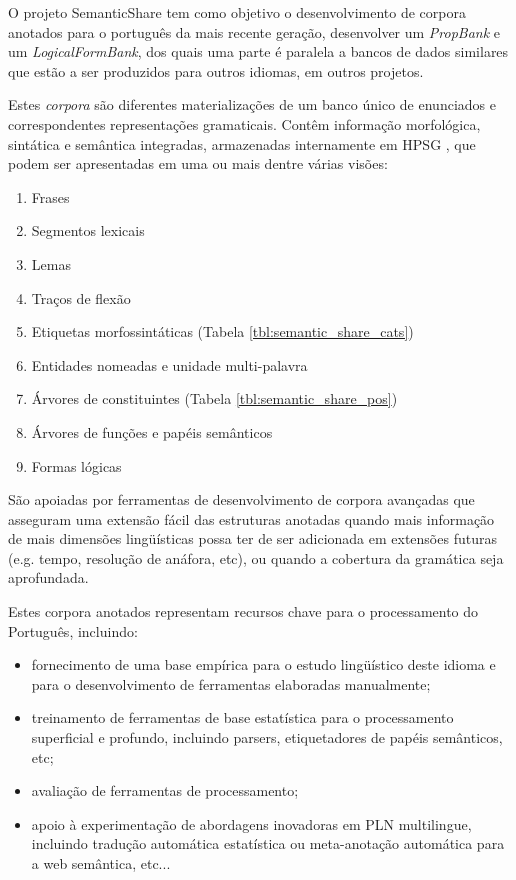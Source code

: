 O projeto SemanticShare \cite{semanticshare} tem como objetivo o desenvolvimento de corpora anotados para o português da mais recente geração, desenvolver um \emph{PropBank} e um \emph{LogicalFormBank}, dos quais uma parte é paralela a bancos de dados similares que estão a ser produzidos para outros idiomas, em outros projetos.

Estes \emph{corpora} são diferentes materializações de um banco único de enunciados e correspondentes representações gramaticais. Contêm informação morfológica, sintática e semântica integradas, armazenadas internamente em HPSG \cite{branco08}, que podem ser apresentadas em uma ou mais dentre várias visões:

\begin{enumerate}
  \item Frases
  \item Segmentos lexicais
  \item Lemas
  \item Traços de flexão
  \item Etiquetas morfossintáticas (Tabela \ref{tbl:semantic_share_cats})
  \item Entidades nomeadas e unidade multi-palavra
  \item Árvores de constituintes (Tabela \ref{tbl:semantic_share_pos})
  \item Árvores de funções e papéis semânticos
  \item Formas lógicas
\end{enumerate}

São apoiadas por ferramentas de desenvolvimento de corpora avançadas que asseguram uma extensão fácil das estruturas anotadas quando mais informação de mais dimensões lingüísticas possa ter de ser adicionada em extensões futuras (e.g. tempo, resolução de anáfora, etc), ou quando a cobertura da gramática seja aprofundada.

Estes corpora anotados representam recursos chave para o processamento do Português, incluindo:

\begin{itemize}
  \item fornecimento de uma base empírica para o estudo lingüístico deste idioma e para o desenvolvimento de ferramentas elaboradas manualmente;
  \item treinamento de ferramentas de base estatística para o processamento superficial e profundo, incluindo parsers, etiquetadores de papéis semânticos, etc;
  \item avaliação de ferramentas de processamento;
  \item  apoio à experimentação de abordagens inovadoras em PLN multilingue, incluindo tradução automática estatística ou meta-anotação automática para a web semântica, etc...
\end{itemize}

